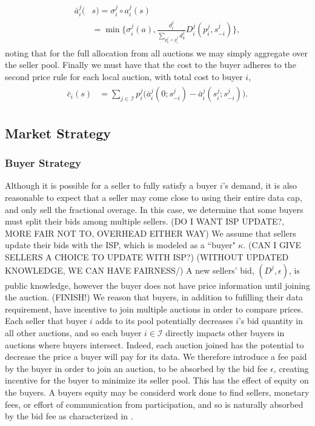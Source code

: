 \documentclass[12pt]{article}
\theoremstyle{definition}
\newcommand{\mcI}{\mathcal{I}}
\newcommand{\g}{\sigma}
\begin{document}
\begin{multicols}{2}
\begin{align}
\begin{split}
    \bar{a}_i^j(&s) = \g_i^j \circ a_i^j(s) \\
    &= \min\bigg\lbrace \g_i^j(a), 
    \frac{d_i^j}{\displaystyle\sum_{p_k^j= p_i^j}d_k^j} 
D_i^j(p_i^j,s_{-i}^j)\bigg\rbrace,
\end{split}
\end{align}
noting that for the full allocation from all auctions we may simply aggregate
over the seller pool.
Finally we must have that the cost to the buyer adheres to the second price
rule for each local auction, with total cost to buyer $i$,
\begin{align}\label{datacost}
\begin{split}
    \bar{c}_i(s) &= \displaystyle\sum_{j\in\mcI} 
    p_i^j \bigg(\bar{a}_i^j(0; s_{-i}^j)
    -\bar{a}_i^j(s_i^j;s_{-i}^j)\bigg).
\end{split}
\end{align}

\subsection{Market Strategy}
\subsubsection{Buyer Strategy}

Although it is possible for a seller to fully satisfy a buyer $i$'s demand, it
is also reasonable to expect that a seller may come close to using their
entire data cap, and only sell the fractional overage. In this case, we
determine that some buyers must split their bids among multiple sellers. 
(DO I WANT ISP UPDATE?, MORE FAIR NOT TO, OVERHEAD EITHER WAY)
We assume that sellers update their bids with the ISP, which is modeled as a
``buyer" $\kappa$. (CAN I GIVE SELLERS A CHOICE TO UPDATE WITH ISP?)
(WITHOUT UPDATED KNOWLEDGE, WE CAN HAVE FAIRNESS/)
A new sellers' bid, $(D^j, \epsilon)$, is public knowledge, however the buyer does not have
price information until joining the auction. (FINISH!)
We reason that buyers,
in addition to fufilling their data requirement, have incentive to join
multiple auctions in order to compare prices. Each seller that buyer $i$ adds
to its pool potentially decreases $i$'s bid quantity in all other auctions, and
so each buyer $i\in\mcI$ directly impacts other buyers in auctions where buyers intersect.
Indeed, each auction joined has the potential to decrease the price a buyer
will pay for its data. We therefore introduce a fee paid by the buyer in order
to join an auction, to be absorbed by the bid fee $\epsilon$, creating
incentive for the buyer to minimize its seller pool. This has the effect of
equity on the buyers. A buyers equity may be considerd work done to find
sellers, monetary fees, or effort of communication from participation, and so
is naturally absorbed by the bid fee as characterized in \cite{semret}.


\end{multicols}
\end{document}
